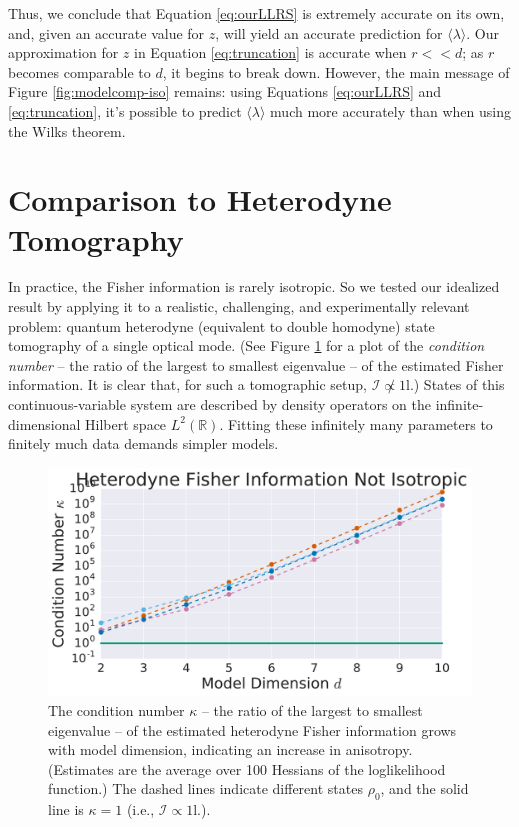 \documentclass[aps,pra, twocolumn]{revtex4-1}
\newcommand{\reals}{\mathbb{R}}
\newcommand{\Id}{\mathbb{I}}
\def\Id{1\!\mathrm{l}}
\begin{document}
Thus, we conclude that Equation \eqref{eq:ourLLRS} is extremely accurate on its own, and, given an accurate value for $z$, will yield an accurate prediction for $\langle \lambda \rangle$. Our approximation for $z$ in Equation \eqref{eq:truncation} is accurate when $r << d$; as $r$ becomes comparable to $d$, it begins to break down. However, the main message of Figure \ref{fig:modelcomp-iso} remains: using Equations \eqref{eq:ourLLRS} and \eqref{eq:truncation}, it's possible to predict $\langle \lambda \rangle$ much more accurately than when using the Wilks theorem. 



\section{Comparison to Heterodyne Tomography}
\label{sec:heterotomo}
In practice, the Fisher information is rarely isotropic.  So we tested our idealized result by applying it to a realistic, challenging, and experimentally relevant problem: quantum heterodyne (equivalent to double homodyne) state tomography \cite{Lvovsky2001a, Bertrand1987, Leonhardt1995, Lvovsky2009} of a single optical mode.  (See Figure \ref{fig:fish_condition} for a plot of the \emph{condition number} -- the ratio of the largest to smallest eigenvalue -- of the estimated Fisher information. It is clear that, for such a tomographic setup, $\mathcal{I} \not \propto \Id$.) States of this continuous-variable system are described by density operators on the infinite-dimensional Hilbert space $L^2(\reals)$.  Fitting these infinitely many parameters to finitely much data demands simpler models.

\begin{figure}[h]
  \includegraphics[width=\columnwidth]{Images/Figure_7.pdf}
 \caption{The condition number $\kappa$ -- the ratio of the largest to smallest eigenvalue -- of the estimated heterodyne Fisher information grows with model dimension, indicating an increase in anisotropy. (Estimates are the average over 100 Hessians of the loglikelihood function.) The dashed lines indicate different states $\rho_{0}$, and the solid line is $\kappa = 1$ (i.e., $\mathcal{I} \propto \Id$.).}
\label{fig:fish_condition}
\end{figure}
\end{document}
